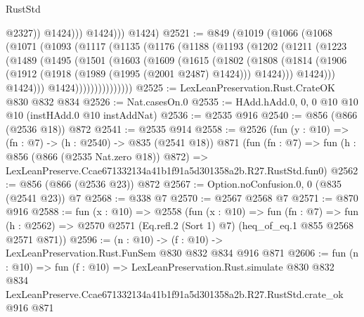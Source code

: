 \begin{lexlean}{RustStd}
\begin{coremodule}
                      @2327))
                  @1424)))
            @1424)))
      @1424)
@2521 := @849
    (@1019
      (@1066
        (@1068
          (@1071
            (@1093
              (@1117
                (@1135
                  (@1176
                    (@1188
                      (@1193
                        (@1202
                          (@1211
                            (@1223
                              (@1489
                                (@1495
                                  (@1501
                                    (@1603
                                      (@1609
                                        (@1615
                                          (@1802
                                            (@1808
                                              (@1814
                                                (@1906
                                                  (@1912
                                                    (@1918 (@1989 (@1995 (@2001 @2487) @1424)))
                                                    @1424)))
                                              @1424)))
                                        @1424)))
                                  @1424)))))))))))))))
@2525 := LexLeanPreservation.Rust.CrateOK @830 @832 @834
@2526 := Nat.casesOn.{0}
@2535 := HAdd.hAdd.{0, 0, 0} @10 @10 @10 (instHAdd.{0} @10 instAddNat)
@2536 := @2535 @916
@2540 := @856 (@866 (@2536 @18)) @872
@2541 := @2535 @914
@2558 := @2526
    (fun (y : @10) => (fn : @7) -> (h : @2540) -> @835 (@2541 @18))
    @871
    (fun (fn : @7) =>
    fun (h : @856 (@866 (@2535 Nat.zero @18)) @872) =>
    LexLeanPreserve.Ccae671332134a41b1f91a5d301358a2b.R27.RustStd.fun0)
@2562 := @856 (@866 (@2536 @23)) @872
@2567 := Option.noConfusion.{0, 0} (@835 (@2541 @23)) @7
@2568 := @338 @7
@2570 := @2567 @2568 @7
@2571 := @870 @916
@2588 := fun (x : @10) =>
  @2558
    (fun (x : @10) =>
    fun (fn : @7) =>
    fun (h : @2562) => @2570 @2571 (Eq.refl.{2} (Sort 1) @7) (heq_of_eq.{1} @855 @2568 @2571 @871))
@2596 := (n : @10) -> (f : @10) -> LexLeanPreservation.Rust.FunSem @830 @832 @834 @916 @871
@2606 := fun (n : @10) =>
  fun (f : @10) =>
  LexLeanPreservation.Rust.simulate
    @830
    @832
    @834
    LexLeanPreserve.Ccae671332134a41b1f91a5d301358a2b.R27.RustStd.crate_ok
    @916
    @871
\end{coremodule}
\end{lexlean}
